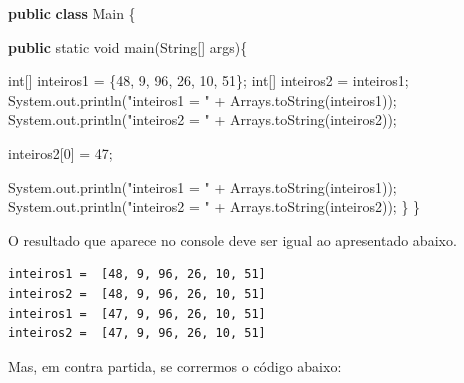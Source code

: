 \documentclass[
]{book}
\newenvironment{Shaded}{\begin{snugshade}}{\end{snugshade}}
\newcommand{\BuiltInTok}[1]{#1}
\newcommand{\DataTypeTok}[1]{\textcolor[rgb]{0.13,0.29,0.53}{#1}}
\newcommand{\DecValTok}[1]{\textcolor[rgb]{0.00,0.00,0.81}{#1}}
\newcommand{\FunctionTok}[1]{\textcolor[rgb]{0.00,0.00,0.00}{#1}}
\newcommand{\KeywordTok}[1]{\textcolor[rgb]{0.13,0.29,0.53}{\textbf{#1}}}
\newcommand{\NormalTok}[1]{#1}
\newcommand{\StringTok}[1]{\textcolor[rgb]{0.31,0.60,0.02}{#1}}
\begin{document}
\begin{Shaded}
\begin{Highlighting}[]
\KeywordTok{public} \KeywordTok{class}\NormalTok{ Main \{}

    \KeywordTok{public} \DataTypeTok{static} \DataTypeTok{void} \FunctionTok{main}\NormalTok{(}\BuiltInTok{String}\NormalTok{[] args)\{}

        \DataTypeTok{int}\NormalTok{[] inteiros1 = \{}\DecValTok{48}\NormalTok{, }\DecValTok{9}\NormalTok{, }\DecValTok{96}\NormalTok{, }\DecValTok{26}\NormalTok{, }\DecValTok{10}\NormalTok{, }\DecValTok{51}\NormalTok{\};}
        \DataTypeTok{int}\NormalTok{[] inteiros2 = inteiros1;}
        \BuiltInTok{System}\NormalTok{.}\FunctionTok{out}\NormalTok{.}\FunctionTok{println}\NormalTok{(}\StringTok{"inteiros1 =  "}\NormalTok{ + }\BuiltInTok{Arrays}\NormalTok{.}\FunctionTok{toString}\NormalTok{(inteiros1));}
        \BuiltInTok{System}\NormalTok{.}\FunctionTok{out}\NormalTok{.}\FunctionTok{println}\NormalTok{(}\StringTok{"inteiros2 =  "}\NormalTok{ + }\BuiltInTok{Arrays}\NormalTok{.}\FunctionTok{toString}\NormalTok{(inteiros2));}

\NormalTok{        inteiros2[}\DecValTok{0}\NormalTok{] = }\DecValTok{47}\NormalTok{;}

        \BuiltInTok{System}\NormalTok{.}\FunctionTok{out}\NormalTok{.}\FunctionTok{println}\NormalTok{(}\StringTok{"inteiros1 =  "}\NormalTok{ + }\BuiltInTok{Arrays}\NormalTok{.}\FunctionTok{toString}\NormalTok{(inteiros1));}
        \BuiltInTok{System}\NormalTok{.}\FunctionTok{out}\NormalTok{.}\FunctionTok{println}\NormalTok{(}\StringTok{"inteiros2 =  "}\NormalTok{ + }\BuiltInTok{Arrays}\NormalTok{.}\FunctionTok{toString}\NormalTok{(inteiros2));}
\NormalTok{    \}}
\NormalTok{\}}
\end{Highlighting}
\end{Shaded}

O resultado que aparece no console deve ser igual ao apresentado abaixo.

\begin{verbatim}
inteiros1 =  [48, 9, 96, 26, 10, 51]
inteiros2 =  [48, 9, 96, 26, 10, 51]
inteiros1 =  [47, 9, 96, 26, 10, 51]
inteiros2 =  [47, 9, 96, 26, 10, 51]
\end{verbatim}

Mas, em contra partida, se corrermos o código abaixo:
\end{document}
